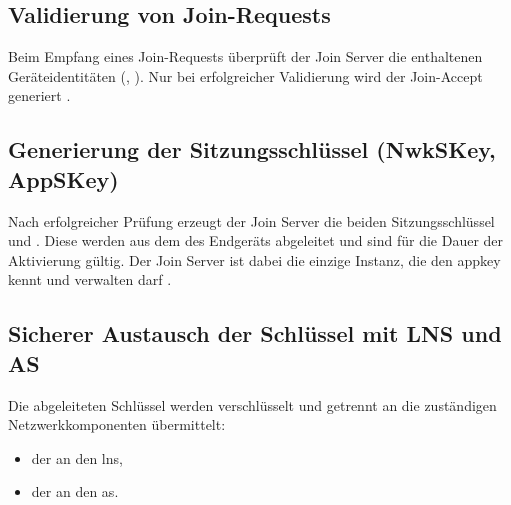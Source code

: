 \subsection{Validierung von Join-Requests}

Beim Empfang eines Join-Requests überprüft der Join Server die enthaltenen Geräteidentitäten (, ). Nur bei erfolgreicher Validierung wird der Join-Accept generiert \cite{Semtech:2024, LoRaAlliance:2020c}.

\subsection{Generierung der Sitzungsschlüssel (NwkSKey, AppSKey)}

Nach erfolgreicher Prüfung erzeugt der Join Server die beiden Sitzungsschlüssel  und . Diese werden aus dem  des Endgeräts abgeleitet und sind für die Dauer der Aktivierung gültig. Der Join Server ist dabei die einzige Instanz, die den \acs{appkey} kennt und verwalten darf \cite{LoRaAlliance:2020c, Montagny:2022}.

\begin{center}
\end{center}

\subsection{Sicherer Austausch der Schlüssel mit LNS und AS}

Die abgeleiteten Schlüssel werden verschlüsselt und getrennt an die zuständigen Netzwerkkomponenten übermittelt:

\begin{itemize}
  \item der  an den \ac{lns},
  \item der  an den \ac{as}.
\end{itemize}

